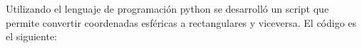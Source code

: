Utilizando el lenguaje de programación python se desarrolló un script que permite convertir coordenadas esféricas a rectangulares y viceversa. El código es el siguiente:

\begin{verbatim}


\end{verbatim}
